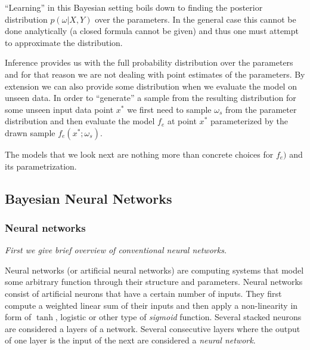 \documentclass[12pt,a4paper,twoside]{scrartcl}
\numberwithin{equation}{section}
\begin{document}
``Learning'' in this Bayesian setting boils down to finding the posterior distribution \(p(\omega |X, Y)\) over the parameters. In the general case this cannot be done analytically (a closed formula cannot be given) and thus one must attempt to approximate the distribution.

Inference provides us with the full probability distribution over the parameters and for that reason we are not dealing with point estimates of the parameters. By extension we can also provide some distribution when we evaluate the model on unseen data. In order to ``generate'' a sample from the resulting distribution for some unseen input data point \(x^*\) we first need to sample \(\omega_s\) from the parameter distribution and then evaluate the model \(f_e\) at point \(x^*\) parameterized by the drawn sample \(f_e(x^*; \omega_s)\).

The models that we look next are nothing more than concrete choices for \(f_e)\) and its parametrization.
\subsection{Bayesian Neural Networks}\label{sec:bnn}
\subsubsection{Neural networks}\label{sec:nn}
\noindent\emph{First we give brief overview of conventional neural networks.}

Neural networks (or artificial neural networks) are computing systems that model some arbitrary function through their structure and parameters. Neural networks consist of artificial neurons that have a certain number of inputs. They first compute a weighted linear sum of their inputs and then apply a non-linearity in form of \(\tanh\), logistic or other type of \emph{sigmoid} function. Several stacked neurons are considered a layers of a network. Several consecutive layers where the output of one layer is the input of the next are considered a \emph{neural network}.
\end{document}
